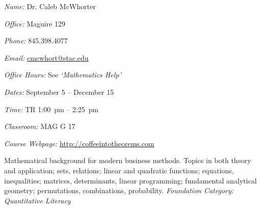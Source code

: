 \documentclass[11pt,letterpaper]{article}
\makeatletter
\newcommand{\classdates}{September 5 -- December 15}
\newcommand{\classtimes}{TR 1:00~pm -- 2:25~pm}
\newcommand{\classroom}{MAG G 17}
\newcommand{\instructor}{Dr. Caleb McWhorter}
\newcommand{\office}{Maguire 129}
\newcommand{\phone}{845.398.4077}
\newcommand{\email}{cmcwhort@stac.edu}
\newcommand{\website}{http://coffeeintotheorems.com}
\newcommand{\officehours}{See \textit{`Mathematics Help'}}
\makeatother
\begin{document}




\textit{Name:} \instructor \par
\textit{Office:} \office \par
\textit{Phone:} \phone \par
\textit{Email:} \href{mailto:\email}{\email} \par
\textit{Office Hours:} \officehours 
\pspace



\textit{Dates:} \classdates \par
\textit{Time:} \classtimes \par
\textit{Classroom:} \classroom \par
\textit{Course Webpage:} \href{\website}{\website}
\sectionbreak



Mathematical background for modern business methods. Topics in both theory and application; sets, relations; linear and quadratic functions; equations, inequalities; matrices, determinants, linear programming; fundamental analytical geometry; permutations, combinations, probability. {\itshape Foundation Category: Quantitative Literacy}
\sectionbreak
\end{document}
